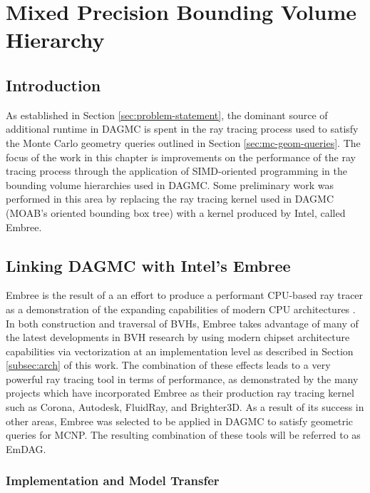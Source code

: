 
\chapter{Mixed Precision Bounding Volume Hierarchy}\label{ch:simd_bvh}


\section{Introduction}

As established in Section \ref{sec:problem-statement}, the dominant source of
additional runtime in DAGMC is spent in the ray tracing process used to satisfy
the Monte Carlo geometry queries outlined in Section \ref{sec:mc-geom-queries}.
The focus of the work in this chapter is improvements on the performance of the
ray tracing process through the application of SIMD-oriented programming in the
bounding volume hierarchies used in DAGMC. Some preliminary work was performed
in this area by replacing the ray tracing kernel used in DAGMC (MOAB's oriented
bounding box tree) with a kernel produced by Intel, called Embree.

\section{Linking DAGMC with Intel's Embree}\label{sec:embree}

Embree is the result of a an effort to produce a performant CPU-based ray tracer
as a demonstration of the expanding capabilities of modern CPU architectures
\cite{Wald_2014}. In both construction and traversal of BVHs, Embree takes
advantage of many of the latest developments in BVH research by using modern
chipset architecture capabilities via vectorization at an implementation level
as described in Section \ref{subsec:arch} of this work. The combination of these
effects leads to a very powerful ray tracing tool in terms of performance, as
demonstrated by the many projects which have incorporated Embree as their
production ray tracing kernel such as Corona, Autodesk, FluidRay, and
Brighter3D. As a result of its success in other areas, Embree was selected to be
applied in DAGMC to satisfy geometric queries for MCNP. The resulting
combination of these tools will be referred to as EmDAG.

\subsection{Implementation and Model Transfer}\label{sec:emdag_transfer}

